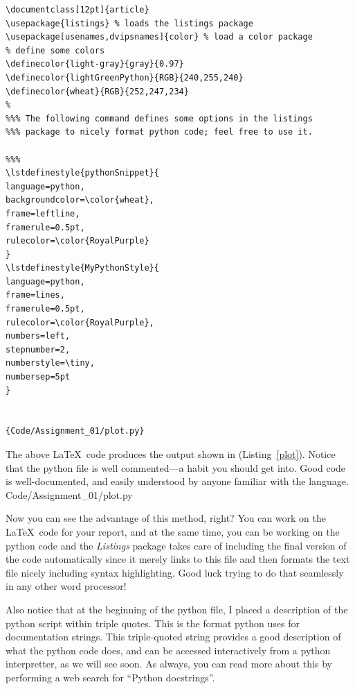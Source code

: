 \begin{lstlisting}[style=myLaTeXStyle, firstnumber=1]
\documentclass[12pt]{article}
\usepackage{listings} % loads the listings package
\usepackage[usenames,dvipsnames]{color} % load a color package
% define some colors
\definecolor{light-gray}{gray}{0.97} 
\definecolor{lightGreenPython}{RGB}{240,255,240}
\definecolor{wheat}{RGB}{252,247,234}
%
%%% The following command defines some options in the listings
%%% package to nicely format python code; feel free to use it.

%%%
\lstdefinestyle{pythonSnippet}{
language=python, 
backgroundcolor=\color{wheat}, 
frame=leftline, 
framerule=0.5pt, 
rulecolor=\color{RoyalPurple}
}
\lstdefinestyle{MyPythonStyle}{
language=python, 
frame=lines, 
framerule=0.5pt, 
rulecolor=\color{RoyalPurple}, 
numbers=left, 
stepnumber=2, 
numberstyle=\tiny, 
numbersep=5pt
}
	

{Code/Assignment_01/plot.py}

\end{lstlisting}

The above \LaTeX\ code produces the output shown in (Listing~\ref{plot}). Notice that the python file is well commented---a habit you should get into. Good code is well-documented, and easily understood by anyone familiar with the language. \\


{Code/Assignment_01/plot.py}


Now you can see the advantage of this method, right? You can work on the \LaTeX\ code for your report, and at the same time, you can be working on the python code and the \textit{Listings} package takes care of including the final version of the code automatically since it merely links to this file and then formats the text file nicely including syntax highlighting. Good luck trying to do that seamlessly in any other word processor!

Also notice that at the beginning of the python file, I placed a description of the python script within triple quotes. This is the format python uses for documentation strings. This triple-quoted string provides a good description of what the python code does, and can be accessed interactively from a python interpretter, as we will see soon. As always, you can read more about this by performing a web search for ``Python docstrings''. 

